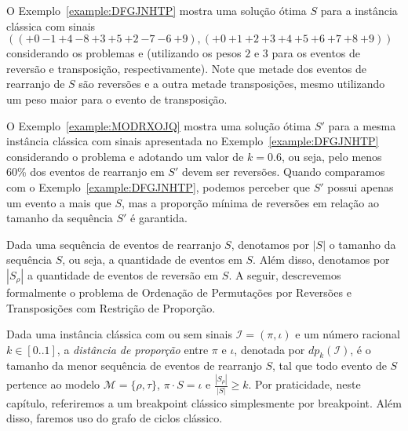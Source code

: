 O Exemplo~\ref{example:DFGJNHTP} mostra uma solução ótima $S$ para a instância clássica com sinais $(({+0}~{-1}~{+4}~{-8}~{+3}~{+5}~{+2}~{-7}~{-6}~{+9}),({+0}~{+1}~{+2}~{+3}~{+4}~{+5}~{+6}~{+7}~{+8}~{+9}))$ considerando os problemas \SbRT{} e \SbWRT{} (utilizando os pesos $2$ e $3$ para os eventos de reversão e transposição, respectivamente). Note que metade dos eventos de rearranjo de $S$ são reversões e a outra metade transposições, mesmo utilizando um peso maior para o evento de transposição.

\pagebreak


O Exemplo~\ref{example:MODRXOJQ} mostra uma solução ótima $S'$ para a mesma instância clássica com sinais apresentada no Exemplo~\ref{example:DFGJNHTP} considerando o problema \SbPRT{} e adotando um valor de $k = 0.6$, ou seja, pelo menos 60\% dos eventos de rearranjo em $S'$ devem ser reversões. Quando comparamos com o Exemplo~\ref{example:DFGJNHTP}, podemos perceber que $S'$ possui apenas um evento a mais que $S$, mas a proporção mínima de reversões em relação ao tamanho da sequência $S'$ é garantida.



Dada uma sequência de eventos de rearranjo $S$, denotamos por $|S|$ o tamanho da sequência $S$, ou seja, a quantidade de eventos em $S$. Além disso, denotamos por $|S_{\rho}|$ a quantidade de eventos de reversão em $S$. A seguir, descrevemos formalmente o problema de Ordenação de Permutações por Reversões e Transposições com Restrição de Proporção.

\begin{task}
\end{task}

Dada uma instância clássica com ou sem sinais $\mathcal{I}=(\pi,\iota)$ e um número racional $k \in [0..1]$, a \emph{distância de proporção} entre $\pi$ e $\iota$, denotada por $dp_{k}(\mathcal{I})$, é o tamanho da menor sequência de eventos de rearranjo $S$, tal que todo evento de $S$ pertence ao modelo $\mathcal{M}=\{\rho,\tau\}$, $\pi \cdot S = \iota$ e $\frac{|S_{\rho}|}{|S|} \ge k$. Por praticidade, neste capítulo, referiremos a um breakpoint clássico simplesmente por breakpoint. Além disso, faremos uso do grafo de ciclos clássico.

